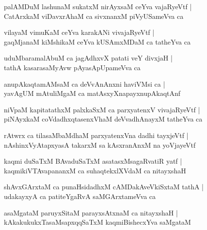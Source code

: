 \documentclass[twoside,12pt,openright]{book}
\newcounter{shloka}[chapter]
\begin{document}
\begin{shloka}
palAMDuM lashunaM sukatxM nirAyxsaM ceYva vajaRyeVtf |\\
CatArxkaM viDavxrAhaM  ca sivxnanxM piVyUSameVva ca 
\end{shloka}

\begin{shloka}
vilayaM vimuKaM ceYva karakANi vivajaRyeVtf |\\
gaqMjanaM kiMshikaM ceYva kUSAmxMDaM ca tatheYva ca
\end{shloka}

\begin{shloka}
uduMbaramalAbuM ca jagAdhxvX patati veY divxjaH |\\
tathA kasarasaMyAvw pAyasApUpameVva ca 
\end{shloka}

\begin{shloka}
anupAkaqtamAMsaM ca deVvAnAnxni haviVMsi ca |\\
yavAgUM mAtuliMgaM ca matAsxyXnapayxnupAkaqtAnf
\end{shloka}

\begin{shloka}
niVpaM kapitatathxM palxkaSxM ca parxyatenxV vivajaRyeVtf |\\
piNAyxkaM coVdadhxqtasenxVhaM deVvadhAnayxM tatheYva ca 
\end{shloka}

\begin{shloka}
rAtwrx ca tilasaMbaMdhaM parxyatenxVna dadhi tayxjeVtf |\\
nAshinxVyAtapxyasA takarxM sa kAsxranAnxM  na yoVjayeVtf 
\end{shloka}

\begin{shloka}
kaqmi duSaTxM BAvaduSaTxM asatasxMsagaRvatiR yatf |\\
kaqmikiVTAvapananxM  ca suhaqtekxlXVdaM ca nitayxshaH 
\end{shloka}

\begin{shloka}
shAvxGArxtaM ca punaHsidadhxM cAMDakAveVkiSxtaM tathA |\\
udakayxyA ca patiteYgaRvA saMGArxtameVva ca 
\end{shloka}

\begin{shloka}
asaMgataM paruyxSitaM parayxsAtxnaM ca nitayxshaH |\\
kAkakukukxTasaMsapxqqSaTxM kaqmiBishecxYva saMgataM
\end{shloka}
\end{document}
